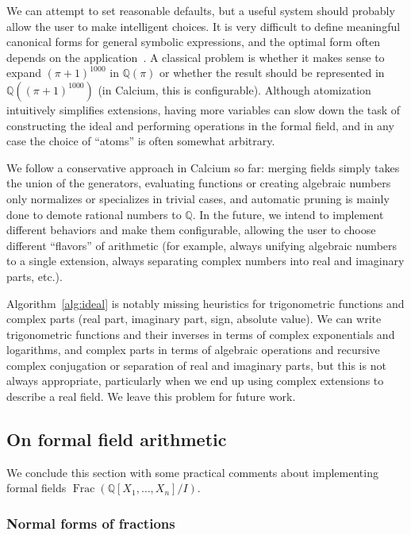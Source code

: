 \documentclass[sigconf,screen,urlbreakonhyphens]{acmart}
\begin{document}
We can attempt to set reasonable defaults, but a useful system
should probably allow the user to make intelligent choices.
It is very difficult to define meaningful canonical forms for general
symbolic expressions, and the optimal
form often depends on the application~\cite{Mos1971,Car2004}.
A classical problem is whether it makes sense to expand $(\pi+1)^{1000}$ in $\mathbb{Q}(\pi)$
or whether the result should be represented in $\mathbb{Q}((\pi+1)^{1000})$
(in Calcium, this is configurable).
Although atomization intuitively simplifies extensions,
having more variables
can slow down the task of constructing
the ideal and performing operations in the formal field,
and in any case the choice of ``atoms'' is often somewhat arbitrary.

We follow a conservative approach in Calcium so far: merging fields simply
takes the union of the generators,
evaluating functions or creating algebraic numbers
only normalizes or specializes in trivial cases,
and automatic pruning is mainly done to demote rational numbers
to $\mathbb{Q}$. In the future, we intend to implement different
behaviors and make them configurable, allowing the user to choose different
``flavors'' of arithmetic (for example, always unifying algebraic numbers to
a single extension, always separating complex numbers into
real and imaginary parts, etc.).

Algorithm~\ref{alg:ideal} 
is notably missing heuristics for
trigonometric functions
and complex parts (real part, imaginary part, sign,
absolute value).
We can write trigonometric functions and their inverses
in terms of complex exponentials and logarithms,
and complex parts in terms of algebraic operations
and recursive complex conjugation or separation of real
and imaginary parts,
but this is not always appropriate, particularly when we end up using
complex extensions to describe a real field.
We leave this problem for future work.

\subsection{On formal field arithmetic}

We conclude this section with
some practical comments
about implementing formal fields
$\operatorname{Frac}(\mathbb{Q}[X_1,\ldots,X_n] / I)$.

\subsubsection{Normal forms of fractions}
\end{document}
